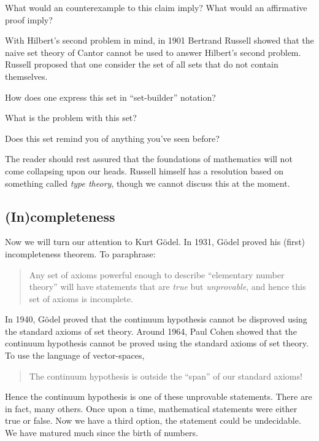 \documentclass[nooutcomes]{ximera}
\begin{document}
\begin{question}
What would an counterexample to this claim imply? What would an
affirmative proof imply?
\end{question}

With Hilbert's second problem in mind, in 1901 Bertrand Russell showed
that the naive set theory of Cantor cannot be used to answer Hilbert's
second problem. Russell proposed that one consider the set of all sets
that do not contain themselves.

\begin{question}
How does one express this set in ``set-builder'' notation?
\end{question}

\begin{question}
 What is the problem with this set? 
\end{question}

\begin{question}
Does this set remind you of anything you've seen before?
\end{question}

The reader should rest assured that the foundations of mathematics
will not come collapsing upon our heads. Russell himself has a
resolution based on something called \textit{type theory}, though we
cannot discuss this at the moment.

\subsection*{(In)completeness}


Now we will turn our attention to Kurt G\"odel. In 1931, G\"odel
proved his (first) incompleteness theorem. To paraphrase:
\begin{quote}
Any set of axioms powerful enough to describe ``elementary number
theory'' will have statements that are \textit{true} but
\textit{unprovable}, and hence this set of axioms is incomplete.
\end{quote}

In 1940, G\"odel proved that the continuum hypothesis cannot be
disproved using the standard axioms of set theory. Around 1964, Paul
Cohen showed that the continuum hypothesis cannot be proved using the
standard axioms of set theory. To use the language of vector-spaces,
\begin{quote}
The continuum hypothesis is outside the ``span'' of our standard axioms!
\end{quote}

Hence the continuum hypothesis is one of these unprovable
statements. There are in fact, many others. Once upon a time,
mathematical statements were either true or false. Now we have a third
option, the statement could be undecidable. We have matured much since
the birth of numbers.
\end{document}
